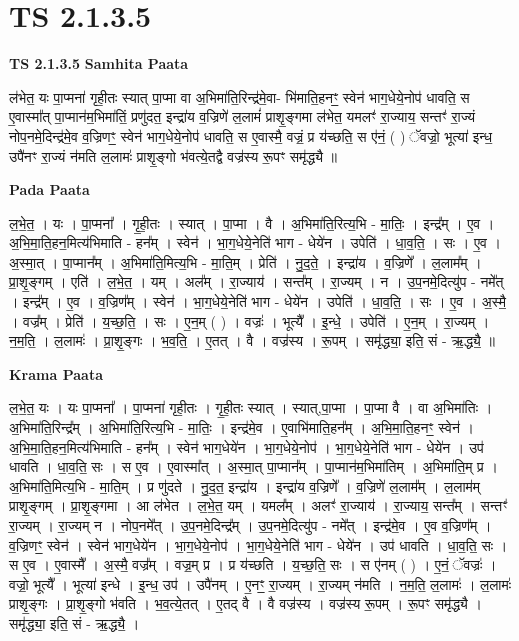 \documentclass[17pt]{extarticle}
\begin{document}
\section{ TS 2.1.3.5 }

\textbf{TS 2.1.3.5 } \newline
\textbf{Samhita Paata} \newline

ल॑भेत॒ यः पा॒प्मना॑ गृही॒तः स्यात् पा॒प्मा वा अ॒भिमा॑ति॒रिन्द्र॑मे॒वा- भि॑माति॒हनꣳ॒॒ स्वेन॑ भाग॒धेये॒नोप॑ धावति॒ स ए॒वास्मा᳚त् पा॒प्मान॑म॒भिमा॑तिं॒ प्रणु॑दत॒ इन्द्रा॑य व॒ज्रिणे॑ ल॒लामं॑ प्राशृ॒ङ्गमा ल॑भेत॒ यमलꣳ॑ रा॒ज्याय॒ सन्तꣳ॑ रा॒ज्यं नोप॒नमे॒दिन्द्र॑मे॒व व॒ज्रिणꣳ॒॒ स्वेन॑ भाग॒धेये॒नोप॑ धावति॒ स ए॒वास्मै॒ वज्रं॒ प्र य॑च्छति॒ स ए॑नं॒ ( ) ॅवज्रो॒ भूत्या॑ इन्ध॒ उपै॑नꣳ रा॒ज्यं न॑मति ल॒लामः॑ प्राशृ॒ङ्गो भ॑वत्ये॒तद्वै वज्र॑स्य रू॒पꣳ समृ॑द्ध्यै ॥ \newline

\textbf{Pada Paata} \newline

ल॒भे॒त॒ । यः । पा॒प्मना᳚ । गृ॒ही॒तः । स्यात् । पा॒प्मा । वै । अ॒भिमा॑ति॒रित्य॒भि - मा॒तिः॒ । इन्द्र᳚म् । ए॒व । अ॒भि॒मा॒ति॒हन॒मित्य॑भिमाति - हन᳚म् । स्वेन॑ । भा॒ग॒धेये॒नेति॑ भाग - धेये॑न । उपेति॑ । धा॒व॒ति॒ । सः । ए॒व । अ॒स्मा॒त् । पा॒प्मान᳚म् । अ॒भिमा॑ति॒मित्य॒भि - मा॒ति॒म् । प्रेति॑ । नु॒द॒ते॒ । इन्द्रा॑य । व॒ज्रिणे᳚ । ल॒लाम᳚म् । प्रा॒शृ॒ङ्गम् । एति॑ । ल॒भे॒त॒ । यम् । अल᳚म् । रा॒ज्याय॑ । सन्त᳚म् । रा॒ज्यम् । न । उ॒प॒नमे॒दित्यु॑प - नमे᳚त् । इन्द्र᳚म् । ए॒व । व॒ज्रिण᳚म् । स्वेन॑ । भा॒ग॒धेये॒नेति॑ भाग - धेये॑न । उपेति॑ । धा॒व॒ति॒ । सः । ए॒व । अ॒स्मै॒ । वज्र᳚म् । प्रेति॑ । य॒च्छ॒ति॒ । सः । ए॒न॒म् ( ) । वज्रः॑ । भूत्यै᳚ । इ॒न्धे॒ । उपेति॑ । ए॒न॒म् । रा॒ज्यम् । न॒म॒ति॒ । ल॒लामः॑ । प्रा॒शृ॒ङ्गः । भ॒व॒ति॒ । ए॒तत् । वै । वज्र॑स्य । रू॒पम् । समृ॑द्ध्या॒ इति॒ सं - ऋ॒द्ध्यै॒ ॥  \newline


\textbf{Krama Paata} \newline

ल॒भे॒त॒ यः । यः पा॒प्मना᳚ । पा॒प्मना॑ गृही॒तः । गृ॒ही॒तः स्यात् । स्यात्,पा॒प्मा । पा॒प्मा वै । वा अ॒भिमा॑तिः । अ॒भिमा॑ति॒रिन्द्र᳚म् । अ॒भिमा॑ति॒रित्य॒भि - मा॒तिः॒ । इन्द्र॑मे॒व । ए॒वाभि॑माति॒हन᳚म् । अ॒भि॒मा॒ति॒हनꣳ॒॒ स्वेन॑ । अ॒भि॒मा॒ति॒हन॒मित्य॑भिमाति - हन᳚म् । स्वेन॑ भाग॒धेये॑न । भा॒ग॒धेये॒नोप॑ । भा॒ग॒धेये॒नेति॑ भाग - धेये॑न । उप॑ धावति । धा॒व॒ति॒ सः । स ए॒व । ए॒वास्मा᳚त् । अ॒स्मा॒त् पा॒प्मान᳚म् । पा॒प्मान॑म॒भिमा॑तिम् । अ॒भिमा॑ति॒म् प्र । अ॒भिमा॑ति॒मित्य॒भि - मा॒ति॒म् । प्र णु॑दते । नु॒द॒त॒ इन्द्रा॑य । इन्द्रा॑य व॒ज्रिणे᳚ । व॒ज्रिणे॑ ल॒लाम᳚म् । ल॒लाम॑म् प्राशृ॒ङ्गम् । प्रा॒शृ॒ङ्गमा । आ ल॑भेत । ल॒भे॒त॒ यम् । यमल᳚म् । अलꣳ॑ रा॒ज्याय॑ । रा॒ज्याय॒ सन्त᳚म् । सन्तꣳ॑ रा॒ज्यम् । रा॒ज्यम् न । नोप॒नमे᳚त् । उ॒प॒नमे॒दिन्द्र᳚म् । उ॒प॒नमे॒दित्यु॑प - नमे᳚त् । इन्द्र॑मे॒व । ए॒व व॒ज्रिण᳚म् । व॒ज्रिणꣳ॒॒ स्वेन॑ । स्वेन॑ भाग॒धेये॑न । भा॒ग॒धेये॒नोप॑ । भा॒ग॒धेये॒नेति॑ भाग - धेये॑न । उप॑ धावति । धा॒व॒ति॒ सः । स ए॒व । ए॒वास्मै᳚ । अ॒स्मै॒ वज्र᳚म् । वज्र॒म् प्र । प्र य॑च्छति । य॒च्छ॒ति॒ सः । स ए॑नम् ( ) । ए॒नं॒ ॅवज्रः॑ । वज्रो॒ भूत्यै᳚ । भूत्या॑ इन्धे । इ॒न्ध॒ उप॑ । उपै॑नम् । ए॒नꣳ॒॒ रा॒ज्यम् । रा॒ज्यम् न॑मति । न॒म॒ति॒ ल॒लामः॑ । ल॒लामः॑ प्राशृ॒ङ्गः । प्रा॒शृ॒ङ्गो भ॑वति । भ॒व॒त्ये॒तत् । ए॒तद् वै । वै वज्र॑स्य । वज्र॑स्य रू॒पम् । रू॒पꣳ समृ॑द्ध्यै । समृ॑द्ध्या॒ इति॒ सं - ऋ॒द्ध्यै॒ । \newline
\end{document}
